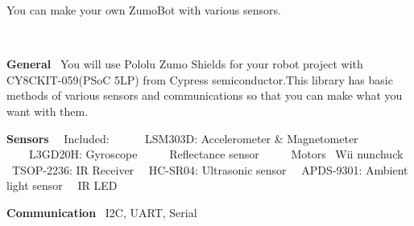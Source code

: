 You can make your own Zumo\+Bot with various sensors.

~\newline
 

{\bfseries General}~\newline
 You will use Pololu Zumo Shields for your robot project with C\+Y8\+C\+K\+I\+T-\/059(P\+SoC 5\+LP) from Cypress semiconductor.\+This library has basic methods of various sensors and communications so that you can make what you want with them. ~\newline
~\newline
~\newline
 

{\bfseries Sensors}~\newline
 ~Included\+: ~\newline
 ~~~~L\+S\+M303D\+: Accelerometer \& Magnetometer~\newline
 ~~~~L3\+G\+D20H\+: Gyroscope~\newline
 ~~~~Reflectance sensor~\newline
 ~~~~Motors ~Wii nunchuck~\newline
 ~T\+S\+O\+P-\/2236\+: IR Receiver~\newline
 ~H\+C-\/\+S\+R04\+: Ultrasonic sensor~\newline
 ~A\+P\+D\+S-\/9301\+: Ambient light sensor~\newline
 ~IR L\+ED ~\newline
~\newline
~\newline
 

{\bfseries Communication}~\newline
 I2C, U\+A\+RT, Serial~\newline
 